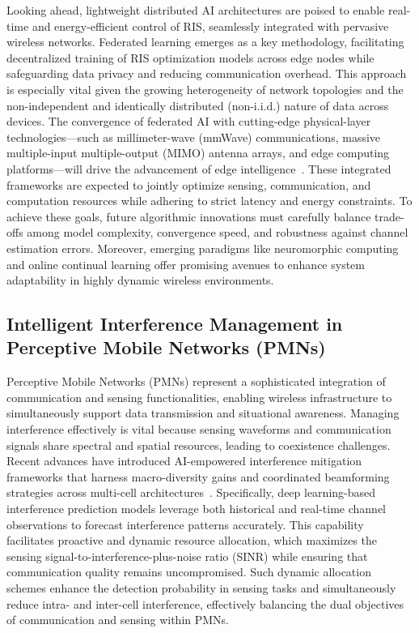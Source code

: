 \documentclass[sigconf]{acmart}
\begin{document}
Looking ahead, lightweight distributed AI architectures are poised to enable real-time and energy-efficient control of RIS, seamlessly integrated with pervasive wireless networks. Federated learning emerges as a key methodology, facilitating decentralized training of RIS optimization models across edge nodes while safeguarding data privacy and reducing communication overhead. This approach is especially vital given the growing heterogeneity of network topologies and the non-independent and identically distributed (non-i.i.d.) nature of data across devices. The convergence of federated AI with cutting-edge physical-layer technologies—such as millimeter-wave (mmWave) communications, massive multiple-input multiple-output (MIMO) antenna arrays, and edge computing platforms—will drive the advancement of edge intelligence~\cite{ref49}. These integrated frameworks are expected to jointly optimize sensing, communication, and computation resources while adhering to strict latency and energy constraints. To achieve these goals, future algorithmic innovations must carefully balance trade-offs among model complexity, convergence speed, and robustness against channel estimation errors. Moreover, emerging paradigms like neuromorphic computing and online continual learning offer promising avenues to enhance system adaptability in highly dynamic wireless environments.

\subsection{Intelligent Interference Management in Perceptive Mobile Networks (PMNs)}

Perceptive Mobile Networks (PMNs) represent a sophisticated integration of communication and sensing functionalities, enabling wireless infrastructure to simultaneously support data transmission and situational awareness. Managing interference effectively is vital because sensing waveforms and communication signals share spectral and spatial resources, leading to coexistence challenges. Recent advances have introduced AI-empowered interference mitigation frameworks that harness macro-diversity gains and coordinated beamforming strategies across multi-cell architectures~\cite{ref48}. Specifically, deep learning-based interference prediction models leverage both historical and real-time channel observations to forecast interference patterns accurately. This capability facilitates proactive and dynamic resource allocation, which maximizes the sensing signal-to-interference-plus-noise ratio (SINR) while ensuring that communication quality remains uncompromised. Such dynamic allocation schemes enhance the detection probability in sensing tasks and simultaneously reduce intra- and inter-cell interference, effectively balancing the dual objectives of communication and sensing within PMNs.
\end{document}
